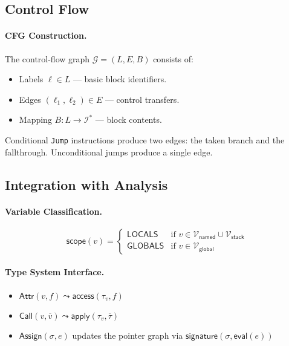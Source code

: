 \subsection{Control Flow}

\paragraph{CFG Construction.}
The control-flow graph $\mathcal{G} = (L, E, B)$ consists of:
\begin{itemize}
\item Labels $\ell \in L$ — basic block identifiers.
\item Edges $(\ell_1, \ell_2) \in E$ — control transfers.
\item Mapping $B : L \to \mathcal{I}^*$ — block contents.
\end{itemize}

Conditional \texttt{Jump} instructions produce two edges: the taken branch and the fallthrough. Unconditional jumps produce a single edge.

\subsection{Integration with Analysis}

\paragraph{Variable Classification.}
\[
\mathsf{scope}(v) =
\begin{cases}
\mathsf{LOCALS} & \text{if } v \in \mathcal{V}_{\mathsf{named}} \cup \mathcal{V}_{\mathsf{stack}} \\
\mathsf{GLOBALS} & \text{if } v \in \mathcal{V}_{\mathsf{global}}
\end{cases}
\]

\paragraph{Type System Interface.}
\begin{itemize}
\item $\mathsf{Attr}(v, f) \leadsto \mathsf{access}(\tau_v, f)$
\item $\mathsf{Call}(v, \overline{v}) \leadsto \mathsf{apply}(\tau_v, \overline{\tau})$
\item $\mathsf{Assign}(\sigma, e)$ updates the pointer graph via $\mathsf{signature}(\sigma, \mathsf{eval}(e))$
\end{itemize}


